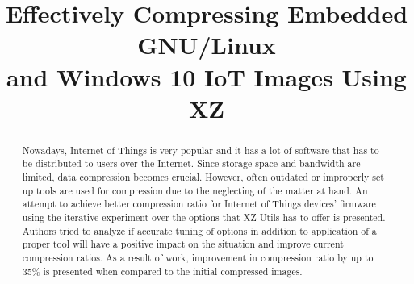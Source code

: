 \documentclass[conference]{IEEEtran}
\begin{document}
%
%
\title{Effectively Compressing Embedded GNU/Linux \\ and Windows 10 IoT Images Using XZ}


\author{
\and
{}
}

\maketitle

\begin{abstract}Nowadays, Internet of Things is very popular and it has a lot of software that has to be distributed to users over the Internet. Since storage space and bandwidth are limited, data compression becomes crucial. However, often outdated or improperly set up tools are used for compression due to the neglecting of the matter at hand. An attempt to achieve better compression ratio for Internet of Things devices' firmware using the iterative experiment over the options that XZ Utils has to offer is presented. Authors tried to analyze if accurate tuning of options in addition to application of a proper tool will have a positive impact on the situation and improve current compression ratios. As a result of work, improvement in compression ratio by up to 35\% is presented when compared to the initial compressed images.
\end{abstract}
\end{document}
